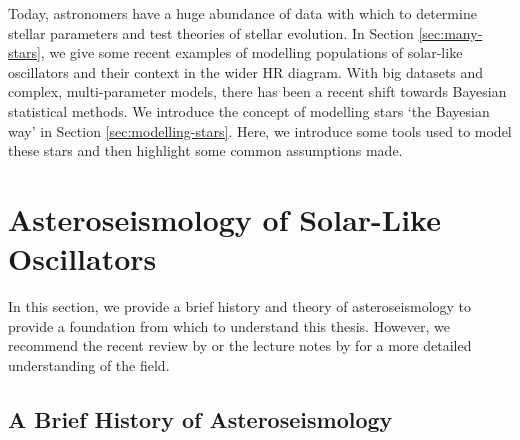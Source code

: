 Today, astronomers have a huge abundance of data with which to determine stellar parameters and test theories of stellar evolution. In Section \ref{sec:many-stars}, we give some recent examples of modelling populations of solar-like oscillators and their context in the wider HR diagram. With big datasets and complex, multi-parameter models, there has been a recent shift towards Bayesian statistical methods. We introduce the concept of modelling stars `the Bayesian way' in Section \ref{sec:modelling-stars}. Here, we introduce some tools used to model these stars and then highlight some common assumptions made.





\section[Solar-Like Oscillators]{Asteroseismology of Solar-Like Oscillators}\label{sec:seismo}

In this section, we provide a brief history and theory of asteroseismology to provide a foundation from which to understand this thesis. However, we recommend the recent review by \citet{Aerts2021} or the lecture notes by \citet{Christensen-Dalsgaard2014} for a more detailed understanding of the field.

\subsection{A Brief History of Asteroseismology}

